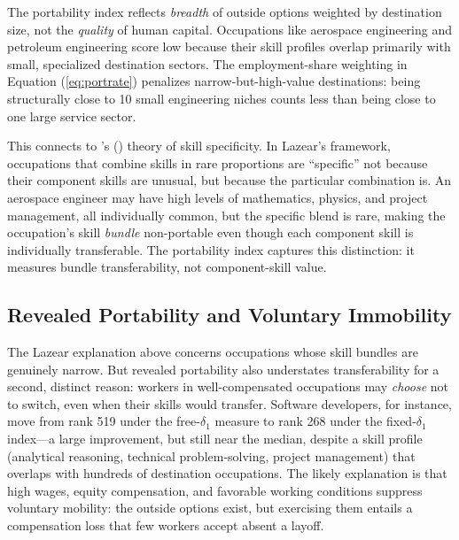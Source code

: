 \documentclass[12pt]{article}
\begin{document}
The portability index reflects \emph{breadth} of outside options weighted by destination size, not the \emph{quality} of human capital. Occupations like aerospace engineering and petroleum engineering score low because their skill profiles overlap primarily with small, specialized destination sectors. The employment-share weighting in Equation (\ref{eq:portrate}) penalizes narrow-but-high-value destinations: being structurally close to 10 small engineering niches counts less than being close to one large service sector.

This connects to \citeauthor{lazear2009}'s (\citeyear{lazear2009}) theory of skill specificity. In Lazear's framework, occupations that combine skills in rare proportions are ``specific'' not because their component skills are unusual, but because the particular combination is. An aerospace engineer may have high levels of mathematics, physics, and project management, all individually common, but the specific blend is rare, making the occupation's skill \emph{bundle} non-portable even though each component skill is individually transferable. The portability index captures this distinction: it measures bundle transferability, not component-skill value.

\subsection{Revealed Portability and Voluntary Immobility}

The Lazear explanation above concerns occupations whose skill bundles are genuinely narrow. But revealed portability also understates transferability for a second, distinct reason: workers in well-compensated occupations may \emph{choose} not to switch, even when their skills would transfer. Software developers, for instance, move from rank 519 under the free-$\delta_1$ measure to rank 268 under the fixed-$\delta_1$ index---a large improvement, but still near the median, despite a skill profile (analytical reasoning, technical problem-solving, project management) that overlaps with hundreds of destination occupations. The likely explanation is that high wages, equity compensation, and favorable working conditions suppress voluntary mobility: the outside options exist, but exercising them entails a compensation loss that few workers accept absent a layoff.
\end{document}
